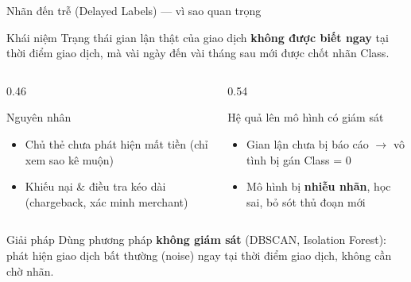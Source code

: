 \documentclass[aspectratio=169,11pt]{beamer}
\newcommand{\mellow}{\transfade[duration=0.5]}
\begin{document}
\begin{frame}{Nhãn đến trễ (Delayed Labels) --- vì sao quan trọng}
  \mellow
  \begin{block}{Khái niệm}
    Trạng thái gian lận thật của giao dịch \textbf{không được biết ngay} tại thời
    điểm giao dịch, mà vài ngày đến vài tháng sau mới được chốt nhãn Class.
  \end{block}
  \begin{columns}
    \begin{column}{0.46\textwidth}
      \begin{block}{Nguyên nhân}
        \begin{itemize}
          \item Chủ thẻ chưa phát hiện mất tiền (chỉ xem sao kê muộn)
          \item Khiếu nại \& điều tra kéo dài (chargeback, xác minh merchant)
        \end{itemize}
      \end{block}
    \end{column}
    \begin{column}{0.54\textwidth}
      \begin{block}{Hệ quả lên mô hình có giám sát}
        \begin{itemize}
          \item Gian lận chưa bị báo cáo $\to$ vô tình bị gán Class = 0
          \item Mô hình bị \textbf{nhiễu nhãn}, học sai, bỏ sót thủ đoạn mới
        \end{itemize}
      \end{block}
    \end{column}
  \end{columns}
  \begin{block}{Giải pháp}
    Dùng phương pháp \textbf{không giám sát} (DBSCAN, Isolation Forest): phát hiện
    giao dịch bất thường (noise) ngay tại thời điểm giao dịch, không cần chờ nhãn.
  \end{block}
\end{frame}
\end{document}
